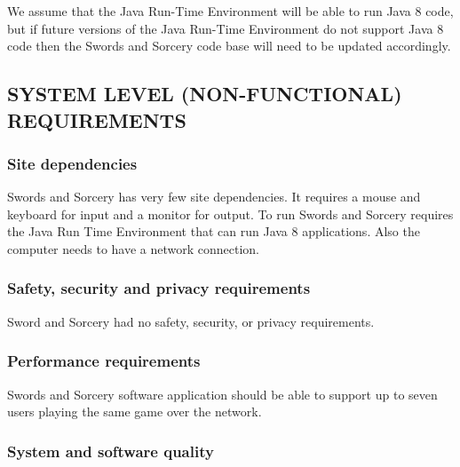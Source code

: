 \documentclass[twoside,letterpaper,pdftex]{article}
\begin{document}
We assume that the Java Run-Time Environment will be able to run Java 8 code, but if future versions of the Java Run-Time Environment do not support Java 8 code then the Swords and Sorcery code base will need to be updated accordingly.

\subsection[SYSTEM LEVEL (NON{}-FUNCTIONAL) REQUIREMENTS]{\rmfamily\bfseries
SYSTEM LEVEL (NON-FUNCTIONAL) REQUIREMENTS}
\hypertarget{RefHeading18259017292}{}{\itshape
}

\subsubsection[Site dependencies]{\rmfamily\bfseries Site dependencies}
\hypertarget{RefHeading18459017292}{}{
{\textit{ }}
{\textit{ }}}

Swords and Sorcery has very few site dependencies. It requires a mouse and keyboard for input and a monitor for output. To run Swords and Sorcery requires the Java Run Time Environment that can run Java 8 applications. Also the computer needs to have a network connection.

\subsubsection[Safety, security and privacy requirements]{\rmfamily\bfseries
Safety, security and privacy requirements}
\hypertarget{RefHeading18659017292}{}{\itshape
}

Sword and Sorcery had no safety, security, or privacy requirements.

\subsubsection[Performance requirements]{\rmfamily\bfseries Performance
requirements}
\hypertarget{RefHeading18859017292}{}{\itshape
}

Swords and Sorcery software application should be able to support up to seven users playing the same
game over the network.

\subsubsection[System and software quality]{\rmfamily\bfseries System and software
quality}
\hypertarget{RefHeading19059017292}{}{\itshape
}
\end{document}
